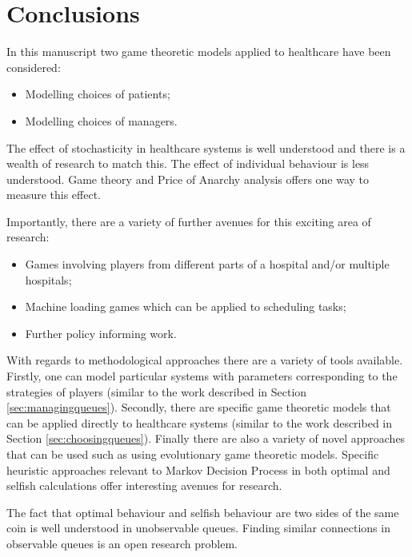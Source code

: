 \documentclass[a4paper,11pt]{article}
\begin{document}
\section{Conclusions}\label{sec:conclusion}

In this manuscript two game theoretic models applied to healthcare have been considered:

\begin{itemize}
    \item Modelling choices of patients;
    \item Modelling choices of managers.
\end{itemize}

The effect of stochasticity in healthcare systems is well understood and there is a wealth of research to match this.
The effect of individual behaviour is less understood.
Game theory and Price of Anarchy analysis offers one way to measure this effect.

Importantly, there are a variety of further avenues for this exciting area of research:

\begin{itemize}
    \item Games involving players from different parts of a hospital and/or multiple hospitals;
    \item Machine loading games which can be applied to scheduling tasks;
    \item Further policy informing work.
\end{itemize}

With regards to methodological approaches there are a variety of tools available.
Firstly, one can model particular systems with parameters corresponding to the strategies of players (similar to the work described in Section \ref{sec:managingqueues}).
Secondly, there are specific game theoretic models that can be applied directly to healthcare systems (similar to the work described in Section \ref{sec:choosingqueues}).
Finally there are also a variety of novel approaches that can be used such as using evolutionary game theoretic models.
Specific heuristic approaches relevant to Markov Decision Process in both optimal and selfish calculations offer interesting avenues for research.

The fact that optimal behaviour and selfish behaviour are two sides of the same coin is well understood in unobservable queues.
Finding similar connections in observable queues is an open research problem.

\newpage


\end{document}
